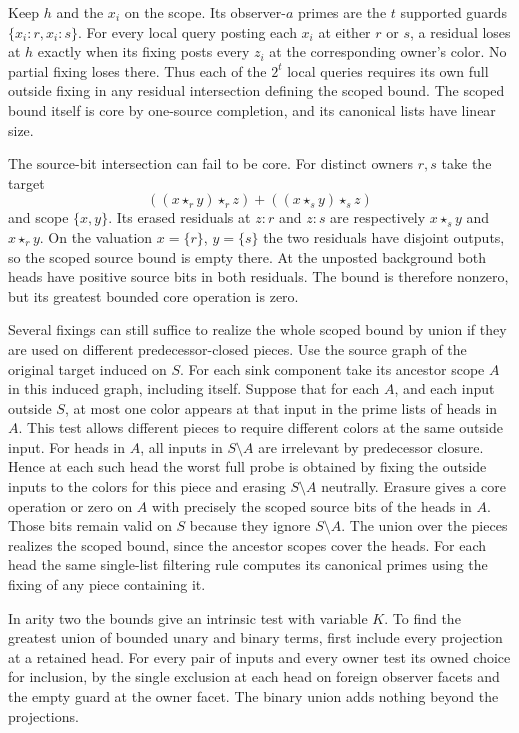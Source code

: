 Keep $h$ and the $x_i$ on the scope. Its
observer-$a$ primes are the $t$ supported guards
$\{x_i:r,x_i:s\}$. For every local query posting
each $x_i$ at either $r$ or $s$, a residual loses
at $h$ exactly when its fixing posts every $z_i$
at the corresponding owner's color. No partial
fixing loses there. Thus each of the $2^t$ local
queries requires its own full outside fixing in
any residual intersection defining the scoped
bound. The scoped bound itself is core by
one-source completion, and its canonical lists
have linear size.

The source-bit intersection can fail to be core.
For distinct owners $r,s$ take the target
\[
 ((x\star_r y)\star_r z)+((x\star_s y)\star_s z)
\]
and scope $\{x,y\}$. Its erased residuals at $z:r$
and $z:s$ are respectively $x\star_s y$ and
$x\star_r y$. On the valuation $x=\{r\}$,
$y=\{s\}$ the two residuals have disjoint outputs,
so the scoped source bound is empty there. At the
unposted background both heads have positive source
bits in both residuals. The bound is therefore
nonzero, but its greatest bounded core operation is
zero.

Several fixings can still suffice to realize the
whole scoped bound by union if they are used on
different predecessor-closed pieces. Use the source
graph of the original target induced on $S$.
For each sink component take its ancestor scope
$A$ in this induced graph, including itself.
Suppose that for each $A$, and each input outside
$S$, at most one color appears at that input in
the prime lists of heads in $A$. This test allows
different pieces to require different colors at
the same outside input. For heads in $A$, all
inputs in $S\setminus A$ are irrelevant by
predecessor closure. Hence at each such head
the worst full probe is obtained by fixing the
outside inputs to the colors for this piece and
erasing $S\setminus A$ neutrally. Erasure gives
a core operation or zero on $A$ with precisely
the scoped source bits of the heads in $A$.
Those bits remain valid on $S$ because they
ignore $S\setminus A$. The union over the pieces
realizes the scoped bound, since the ancestor
scopes cover the heads. For each head the same
single-list filtering rule computes its canonical
primes using the fixing of any piece containing
it.

In arity two the bounds give an intrinsic test with variable
$K$. To find the greatest union of bounded unary and binary
terms, first include every projection at a retained head.
For every pair of inputs and every owner test its owned
choice for inclusion, by the single exclusion at each head
on foreign observer facets and the empty guard at the owner
facet. The binary union adds nothing beyond the projections.

